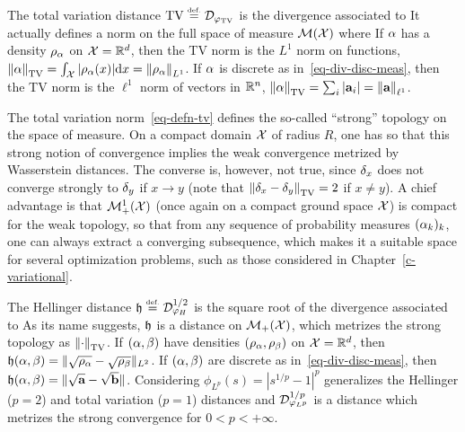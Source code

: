 \begin{example}\label{exmp-tv}
The total variation distance $\TV \eqdef \Divergm_{\phi_{\TV}}$ is the divergence associated to
It actually defines a norm on the full space of measure $\mathcal{M}(\mathcal{X})$ where
If $\alpha$ has a density $\rho_{\alpha}$ on $\mathcal{X}=\mathbb{R}^d$, then the TV norm is the $L^1$ norm on functions, $\left\| \alpha \right\|_{\operatorname{TV}} = \int_{\mathcal{X}} |\rho_{\alpha}(x)| \mathrm{d} x = \left\| \rho_{\alpha} \right\|_{L^1}$.
%
If $\alpha$ is discrete as in~\eqref{eq-div-disc-meas}, then the TV norm is the $\ell^1$ norm of vectors in $\mathbb{R}^n$, $\left\| \alpha \right\|_{\operatorname{TV}}=\sum_i |\mathrm{\textbf{a}}_i| = \left\| \mathrm{\textbf{a}} \right\|_{\ell^1}$.
\end{example}

\begin{rem}
	The total variation norm~\eqref{eq-defn-tv} defines the so-called ``strong'' topology on the space of measure. 
	On a compact domain $\mathcal{X}$ of radius $R$, one has 
	so that this strong notion of convergence implies the weak convergence metrized by Wasserstein distances. 
	The converse is, however, not true, since $\delta_x$ does not converge strongly to $\delta_y$ if $x \rightarrow y$ (note that
	$\left\| \delta_x-\delta_y \right\|_{\operatorname{TV}}=2$ if $x \neq y$). 
	A chief advantage is that $\mathcal{M}_+^1(\mathcal{X})$ (once again on a compact ground space $\mathcal{X}$) is compact for the weak topology, so that from any sequence of probability measures $(\alpha_k)_k$, one can always extract a converging subsequence, which makes it a suitable space for several optimization problems, such as those considered in Chapter~\ref{c-variational}.
\end{rem}


\begin{example}[Hellinger]\label{exmp-hellinger}
	The Hellinger distance $\Hellinger \eqdef \Divergm_{\phi_{H}}^{1/2}$ is the square root of the divergence associated to
	As its name suggests, $\mathfrak{h}$ is a distance on $\mathcal{M}_+(\mathcal{X})$, which metrizes the strong topology as $\left\| \cdot \right\|_{\operatorname{TV}}$. 
	If $(\alpha,\beta)$ have densities $(\rho_{\alpha},\rho_{\beta})$ on $\mathcal{X}=\mathbb{R}^d$, then $\mathfrak{h}(\alpha,\beta) = \| \sqrt{\rho_{\alpha}}-\sqrt{\rho_{\beta}} \|_{L^2}$.
	If $(\alpha,\beta)$ are discrete as in~\eqref{eq-div-disc-meas}, then $\mathfrak{h}(\alpha,\beta) = \| \sqrt{\mathrm{\textbf{a}}}-\sqrt{\mathrm{\textbf{b}}} \|$.	
	Considering $\phi_{L^p}(s)=|s^{1/p}-1|^p$ generalizes the Hellinger ($p=2$) and total variation ($p=1$) distances
	and $\mathcal{D}_{\varphi_{L^p}}^{1/p}$ is a distance which metrizes the strong convergence for $0<p<+\infty$. 
\end{example}


